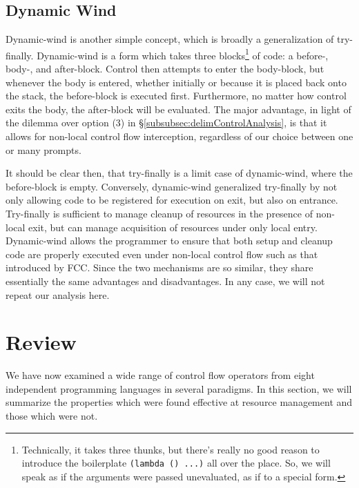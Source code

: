 \documentclass[11pt]{article}
\newcommand{\maybePage}{\newpage}
\begin{document}
\maybePage
\subsection{Dynamic Wind}
\label{dynamic-wind}

Dynamic-wind is another simple concept, which is broadly a generalization of try-finally.
Dynamic-wind is a form which takes three blocks\footnote{Technically, it takes three thunks, but there's really no good reason to introduce the boilerplate \texttt{(lambda () ...)} all over the place. So, we will speak as if the arguments were passed unevaluated, as if to a special form.} of code: a before-, body-, and after-block.
Control then attempts to enter the body-block, but whenever the body is entered, whether initially or because it is placed back onto the stack, the before-block is executed first.
Furthermore, no matter how control exits the body, the after-block will be evaluated.
The major advantage, in light of the dilemma over option (3) in \S\ref{subsubsec:delimControlAnalysis}, is that it allows for non-local control flow interception, regardless of our choice between one or many prompts.


It should be clear then, that try-finally is a limit case of dynamic-wind, where the before-block is empty.
Conversely, dynamic-wind generalized try-finally by not only allowing code to be registered for execution on exit, but also on entrance.
Try-finally is sufficient to manage cleanup of resources in the presence of non-local exit, but can manage acquisition of resources under only local entry.
Dynamic-wind allows the programmer to ensure that both setup and cleanup code are properly executed even under non-local control flow such as that introduced by FCC.
Since the two mechanisms are so similar, they share essentially the same advantages and disadvantages.
In any case, we will not repeat our analysis here.




\maybePage
\section{Review}
\label{sec:review}

We have now examined a wide range of control flow operators from eight independent programming languages in several paradigms.
In this section, we will summarize the properties which were found effective at resource management and those which were not.
\end{document}
